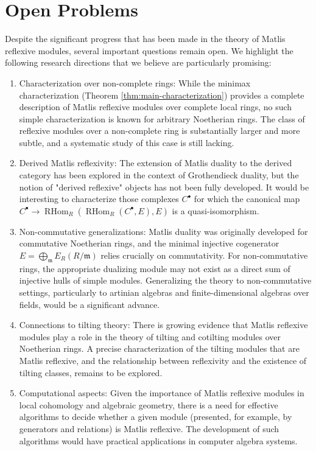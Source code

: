 \documentclass{kms-c}
\theoremstyle{plain}
\theoremstyle{definition}
\theoremstyle{remark}
\begin{document}
\section{Open Problems}

Despite the significant progress that has been made in the theory of Matlis reflexive modules, several important questions remain open. We highlight the following research directions that we believe are particularly promising:

\begin{enumerate}
\item {Characterization over non-complete rings:} While the minimax characterization (Theorem \ref{thm:main-characterization}) provides a complete description of Matlis reflexive modules over complete local rings, no such simple characterization is known for arbitrary Noetherian rings. The class of reflexive modules over a non-complete ring is substantially larger and more subtle, and a systematic study of this case is still lacking.

\item {Derived Matlis reflexivity:} The extension of Matlis duality to the derived category has been explored in the context of Grothendieck duality, but the notion of "derived reflexive" objects has not been fully developed. It would be interesting to characterize those complexes \( C^\bullet \) for which the canonical map \( C^\bullet \to \operatorname{RHom}_R(\operatorname{RHom}_R(C^\bullet, E), E) \) is a quasi-isomorphism.

\item {Non-commutative generalizations:} Matlis duality was originally developed for commutative Noetherian rings, and the minimal injective cogenerator \( E = \bigoplus_{\mathfrak{m}} E_R(R/\mathfrak{m}) \) relies crucially on commutativity. For non-commutative rings, the appropriate dualizing module may not exist as a direct sum of injective hulls of simple modules. Generalizing the theory to non-commutative settings, particularly to artinian algebras and finite-dimensional algebras over fields, would be a significant advance.

\item {Connections to tilting theory:} There is growing evidence that Matlis reflexive modules play a role in the theory of tilting and cotilting modules over Noetherian rings. A precise characterization of the tilting modules that are Matlis reflexive, and the relationship between reflexivity and the existence of tilting classes, remains to be explored.

\item {Computational aspects:} Given the importance of Matlis reflexive modules in local cohomology and algebraic geometry, there is a need for effective algorithms to decide whether a given module (presented, for example, by generators and relations) is Matlis reflexive. The development of such algorithms would have practical applications in computer algebra systems.
\end{enumerate}
\end{document}
